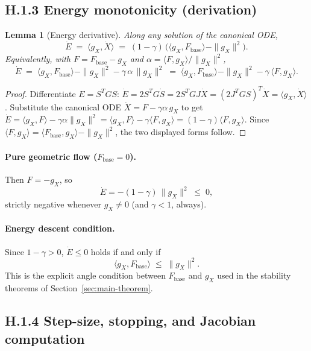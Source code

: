 \documentclass[11pt,oneside]{amsart}
\def\quad{ }%
\theoremstyle{plain}
\newtheorem{lemma}[theorem]{Lemma}
\theoremstyle{definition}
\newcommand{\Xdot}{\dot{X}}
\newcommand{\gX}{g_X}
\newcommand{\Fbase}{F_{\mathrm{base}}}
\begin{document}
\subsection*{H.1.3 \quad Energy monotonicity (derivation)}
\label{sec:Edot}

\begin{lemma}[Energy derivative]
\label{lem:Edot}
Along any solution of the canonical ODE,
\[
  \dot{E}
  \;=\; \langle \gX,\Xdot\rangle
  \;=\; (1-\gamma)\,\bigl(\langle \gX,\Fbase\rangle - \|\gX\|^{2}\bigr).
\]
Equivalently, with $F = \Fbase - \gX$ and
$\alpha = \langle F,\gX\rangle/\|\gX\|^{2}$,
\[
  \boxed{\;\dot{E}
  \;=\; \langle \gX,\Fbase\rangle - \|\gX\|^{2} - \gamma\,\alpha\,\|\gX\|^{2}
  \;=\; \langle \gX,\Fbase\rangle - \|\gX\|^{2} - \gamma\,\langle F,\gX\rangle.\;}
\]
\end{lemma}

\begin{proof}
Differentiate $E = S^{T}GS$:
$\dot{E} = 2S^{T}G\dot{S} = 2S^{T}GJ\dot{X} = (2J^{T}GS)^{T}\dot{X}
= \langle \gX,\Xdot\rangle$. Substitute the canonical ODE
$\Xdot = F - \gamma\alpha\,\gX$ to get
$\dot E = \langle \gX, F\rangle - \gamma\alpha\|\gX\|^{2}
        = \langle \gX, F\rangle - \gamma\langle F,\gX\rangle
        = (1-\gamma)\langle F,\gX\rangle$.
Since $\langle F,\gX\rangle = \langle \Fbase,\gX\rangle - \|\gX\|^{2}$,
the two displayed forms follow.
\end{proof}

\paragraph{Pure geometric flow ($\Fbase = 0$).}
Then $F = -\gX$, so
\[
  \dot{E} = -(1-\gamma)\,\|\gX\|^{2} \;\le\; 0,
\]
strictly negative whenever $\gX\neq 0$ (and $\gamma<1$, always).

\paragraph{Energy descent condition.}
Since $1-\gamma > 0$, $\dot{E}\le 0$ holds if and only if
\[
  \boxed{\;\langle \gX,\Fbase\rangle \;\le\; \|\gX\|^{2}.\;}
\]
This is the explicit angle condition between $\Fbase$ and $\gX$ used in
the stability theorems of Section~\ref{sec:main-theorem}.

\subsection*{H.1.4 \quad Step-size, stopping, and Jacobian computation}
\label{sec:Hpractical}
\end{document}
